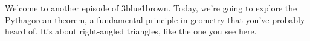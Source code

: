 \documentclass[preview]{standalone}
\begin{document}
\begin{center}
Welcome to another episode of 3blue1brown. Today, we're going to explore the Pythagorean theorem, a fundamental principle in geometry that you've probably heard of. It's about right-angled triangles, like the one you see here.
\end{center}
\end{document}

